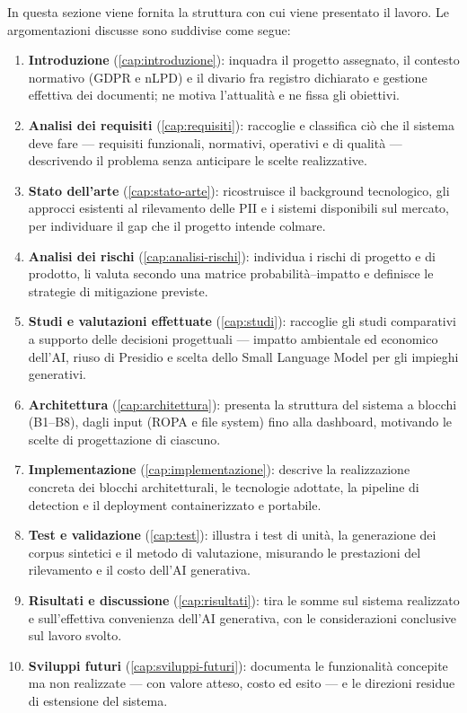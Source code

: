 In questa sezione viene fornita la struttura con cui viene presentato il lavoro. Le argomentazioni discusse sono suddivise come segue:
\begin{enumerate}
	\item \textbf{Introduzione} (\ref{cap:introduzione}): inquadra il progetto assegnato, il contesto normativo (GDPR e nLPD) e il divario fra registro dichiarato e gestione effettiva dei documenti; ne motiva l'attualità e ne fissa gli obiettivi.

	\item \textbf{Analisi dei requisiti} (\ref{cap:requisiti}): raccoglie e classifica ciò che il sistema deve fare — requisiti funzionali, normativi, operativi e di qualità — descrivendo il problema senza anticipare le scelte realizzative.

	\item \textbf{Stato dell'arte} (\ref{cap:stato-arte}): ricostruisce il background tecnologico, gli approcci esistenti al rilevamento delle PII e i sistemi disponibili sul mercato, per individuare il gap che il progetto intende colmare.

	\item \textbf{Analisi dei rischi} (\ref{cap:analisi-rischi}): individua i rischi di progetto e di prodotto, li valuta secondo una matrice probabilità--impatto e definisce le strategie di mitigazione previste.

	\item \textbf{Studi e valutazioni effettuate} (\ref{cap:studi}): raccoglie gli studi comparativi a supporto delle decisioni progettuali — impatto ambientale ed economico dell'AI, riuso di Presidio e scelta dello Small Language Model per gli impieghi generativi.

	\item \textbf{Architettura} (\ref{cap:architettura}): presenta la struttura del sistema a blocchi (B1--B8), dagli input (ROPA e file system) fino alla dashboard, motivando le scelte di progettazione di ciascuno.

	\item \textbf{Implementazione} (\ref{cap:implementazione}): descrive la realizzazione concreta dei blocchi architetturali, le tecnologie adottate, la pipeline di detection e il deployment containerizzato e portabile.

	\item \textbf{Test e validazione} (\ref{cap:test}): illustra i test di unità, la generazione dei corpus sintetici e il metodo di valutazione, misurando le prestazioni del rilevamento e il costo dell'AI generativa.

	\item \textbf{Risultati e discussione} (\ref{cap:risultati}): tira le somme sul sistema realizzato e sull'effettiva convenienza dell'AI generativa, con le considerazioni conclusive sul lavoro svolto.

	\item \textbf{Sviluppi futuri} (\ref{cap:sviluppi-futuri}): documenta le funzionalità concepite ma non realizzate — con valore atteso, costo ed esito — e le direzioni residue di estensione del sistema.
\end{enumerate}